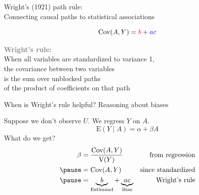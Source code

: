 \documentclass{beamer}
\newcommand\E{\text{E}}
\newcommand\V{\text{V}}
\newcommand{\Cov}{\text{Cov}}
\newcommand\bgray[1]{\textcolor{gray}{\textbf{#1}}}
\begin{document}
\begin{frame}{Wright's (1921) path rule:\\Connecting causal paths to statistical associations}

\begin{center}
\end{center} 

$$\Cov(A,Y) = \textcolor{red}{b} + \textcolor{blue}{ac}$$

\bgray{Wright's rule:}\\When all variables are standardized to variance 1,\\the covariance between two variables\\is the sum over unblocked paths\\of the product of coefficients on that path

\end{frame}


\begin{frame}[t]{When is Wright's rule helpful? Reasoning about biases}

\begin{center}
\end{center} 

Suppose we don't observe $U$. \pause We regress $Y$ on $A$.
$$\E(Y\mid A) = \alpha + \beta A$$ \pause
What do we get? \pause
$$\begin{aligned}
\beta &= \frac{\Cov(A,Y)}{\V(Y)} &\text{from regression} \\ \pause
&= \Cov(A,Y) &\text{since standardized} \\ \pause
&= \underbrace{b}_\text{Estimand} + \underbrace{ac}_\text{Bias} &\text{Wright's rule}
\end{aligned}$$

\end{frame}
\end{document}
